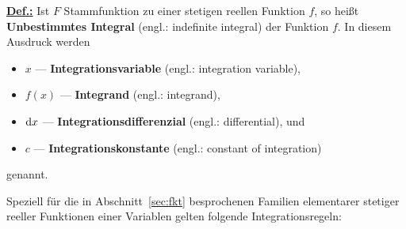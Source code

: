 \medskip
\noindent
\underline{\bf Def.:} Ist $F$ Stammfunktion zu einer stetigen
reellen Funktion $f$, so hei\ss t
%
\be
{}
\ee
%
{\bf Unbestimmtes Integral} (engl.: indefinite integral) der 
Funktion $f$. In diesem Ausdruck werden
%
\begin{itemize}
\item $x$ --- {\bf Integrationsvariable} (engl.: integration 
variable),
\item $f(x)$ --- {\bf Integrand} (engl.: integrand),
\item ${\rm d}x$ --- {\bf Integrationsdifferenzial} (engl.: 
differential), und
\item $c$ --- {\bf Integrationskonstante} (engl.: constant of integration)
\end{itemize}
%
genannt.

\medskip
\noindent
Speziell f\"ur die in Abschnitt~\ref{sec:fkt} besprochenen
Familien elementarer stetiger reeller Funktionen einer
Variablen gelten folgende Integrationsregeln:

